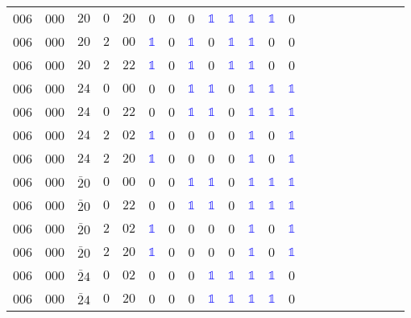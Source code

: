 \begin{longtable*}{c| cccccccccccccccccccc }
006& 000& $20$& $0$& $20$& 0& 0& 0& \textcolor{blue}{$\mathds{1}$}& \textcolor{blue}{$\mathds{1}$}& \textcolor{blue}{$\mathds{1}$}& \textcolor{blue}{$\mathds{1}$}& 0\\
006& 000& $20$& $2$& $00$& \textcolor{blue}{$\mathds{1}$}& 0& \textcolor{blue}{$\mathds{1}$}& 0& \textcolor{blue}{$\mathds{1}$}& \textcolor{blue}{$\mathds{1}$}& 0& 0\\
006& 000& $20$& $2$& $22$& \textcolor{blue}{$\mathds{1}$}& 0& \textcolor{blue}{$\mathds{1}$}& 0& \textcolor{blue}{$\mathds{1}$}& \textcolor{blue}{$\mathds{1}$}& 0& 0\\
006& 000& $24$& $0$& $00$& 0& 0& \textcolor{blue}{$\mathds{1}$}& \textcolor{blue}{$\mathds{1}$}& 0& \textcolor{blue}{$\mathds{1}$}& \textcolor{blue}{$\mathds{1}$}& \textcolor{blue}{$\mathds{1}$}\\
006& 000& $24$& $0$& $22$& 0& 0& \textcolor{blue}{$\mathds{1}$}& \textcolor{blue}{$\mathds{1}$}& 0& \textcolor{blue}{$\mathds{1}$}& \textcolor{blue}{$\mathds{1}$}& \textcolor{blue}{$\mathds{1}$}\\
006& 000& $24$& $2$& $02$& \textcolor{blue}{$\mathds{1}$}& 0& 0& 0& 0& \textcolor{blue}{$\mathds{1}$}& 0& \textcolor{blue}{$\mathds{1}$}\\
006& 000& $24$& $2$& $20$& \textcolor{blue}{$\mathds{1}$}& 0& 0& 0& 0& \textcolor{blue}{$\mathds{1}$}& 0& \textcolor{blue}{$\mathds{1}$}\\
006& 000& $\bar{2}0$& $0$& $00$& 0& 0& \textcolor{blue}{$\mathds{1}$}& \textcolor{blue}{$\mathds{1}$}& 0& \textcolor{blue}{$\mathds{1}$}& \textcolor{blue}{$\mathds{1}$}& \textcolor{blue}{$\mathds{1}$}\\
006& 000& $\bar{2}0$& $0$& $22$& 0& 0& \textcolor{blue}{$\mathds{1}$}& \textcolor{blue}{$\mathds{1}$}& 0& \textcolor{blue}{$\mathds{1}$}& \textcolor{blue}{$\mathds{1}$}& \textcolor{blue}{$\mathds{1}$}\\
006& 000& $\bar{2}0$& $2$& $02$& \textcolor{blue}{$\mathds{1}$}& 0& 0& 0& 0& \textcolor{blue}{$\mathds{1}$}& 0& \textcolor{blue}{$\mathds{1}$}\\
006& 000& $\bar{2}0$& $2$& $20$& \textcolor{blue}{$\mathds{1}$}& 0& 0& 0& 0& \textcolor{blue}{$\mathds{1}$}& 0& \textcolor{blue}{$\mathds{1}$}\\
006& 000& $\bar{2}4$& $0$& $02$& 0& 0& 0& \textcolor{blue}{$\mathds{1}$}& \textcolor{blue}{$\mathds{1}$}& \textcolor{blue}{$\mathds{1}$}& \textcolor{blue}{$\mathds{1}$}& 0\\
006& 000& $\bar{2}4$& $0$& $20$& 0& 0& 0& \textcolor{blue}{$\mathds{1}$}& \textcolor{blue}{$\mathds{1}$}& \textcolor{blue}{$\mathds{1}$}& \textcolor{blue}{$\mathds{1}$}& 0\\

\end{longtable*}
